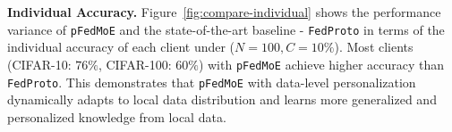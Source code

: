\documentclass[sigconf]{acmart}
\newcommand{\hetero}{heterogeneous }
\newcommand{\homo}{homogeneous }
\newcommand{\pers}{personalized }
\newcommand{\gen}{generalized }
\newcommand{\persN}{personalization }
\newcommand{\genN}{generalization }
\newcommand{\rep}{representation }
\newcommand{\reps}{representations }
\newcommand{\sota}{state-of-the-art }
\newcommand{\methodname}{{\tt{pFedMoE}}}
\begin{document}


\textbf{Individual Accuracy.} Figure~\ref{fig:compare-individual} shows the performance variance of \methodname{} and the \sota baseline - {\tt{FedProto}} in terms of the individual accuracy of each client under ($N=100, C=10\%$). Most clients (CIFAR-10: $76\%$, CIFAR-100: $60\%$) with \methodname{} achieve higher accuracy than {\tt{FedProto}}. This demonstrates that \methodname{} with data-level \persN dynamically adapts to local data distribution and learns more \gen and \pers knowledge from local data.
\end{document}
